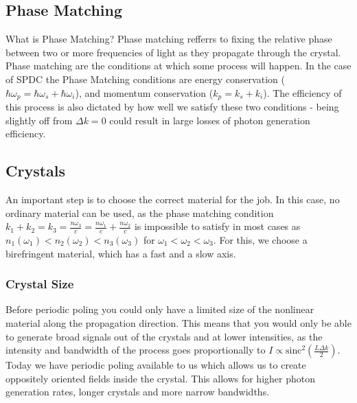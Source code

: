\documentclass{article}
\begin{document}
\subsection{Phase Matching}
What is Phase Matching? Phase matching refferrs to fixing the relative phase between two or more frequencies 
of light as they propagate through the crystal. Phase matching are the conditions at which some process will happen.
In the case of SPDC the Phase Matching conditions are energy conservation ($\hbar \omega_p = \hbar \omega_s + \hbar \omega_i$),
and momentum conservation ($k_p = k_s + k_i$). The efficiency of this process is also dictated by how well we satisfy these 
two conditions - being slightly off from $\Delta k = 0$ could result in large losses of photon generation efficiency.

\subsection{Crystals}
An important step is to choose the correct material for the job. In this case, no ordinary material can be used, 
as the phase matching condition $k_1 + k_2 = k_3 = \frac{n \omega_3}{c} = \frac{n \omega_1}{c} + \frac{n \omega_2}{c}$ is
impossible to satisfy in most cases as
$n_1 \left(	\omega_1 \right) < n_2 \left( \omega_2 \right) < n_3 \left(	\omega_3 \right)$ for $\omega_1 < \omega_2 < \omega_3$.
For this, we choose a birefringent material, which has a fast and a slow axis.

\subsubsection{Crystal Size}
Before periodic poling you could only have a limited size of the nonlinear material along the propagation direction.
This means that you would only be able to generate broad signals out of the crystals and at lower intensities, as the 
intensity and bandwidth of the process goes proportionally to $I \propto \text{sinc}^2\left(\frac{L \Delta k}{2}\right)$.
Today we have periodic poling available to us which allows us to create oppositely oriented fields inside the
crystal. This allows for higher photon generation rates, longer crystals and more narrow bandwidths.
\end{document}
